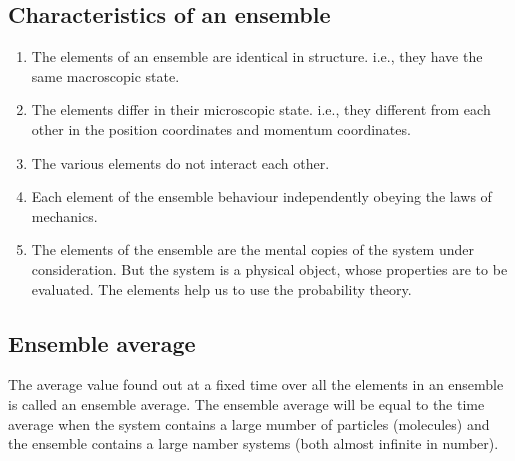 \subsection{Characteristics of an ensemble}
\begin{enumerate}
\item  The elements of an ensemble are identical in structure. i.e., they have the same macroscopic state.
\item  The elements differ in their microscopic state. i.e., they different from each other in the position coordinates and momentum coordinates.
\item  The various elements do not interact each other.
\item  Each element of the ensemble behaviour independently obeying the laws of mechanics.
\item  The elements of the ensemble are the mental copies of the system under consideration. But the system is a physical object, whose properties are to be evaluated. The elements help us to use the probability theory.
\end{enumerate}
\subsection{Ensemble average}
The average value found out at a fixed time over all the elements in an ensemble is called an ensemble average. The ensemble average will be equal to the time average when the system contains a large mumber of particles (molecules) and the ensemble contains a large namber systems (both almost infinite in number).
